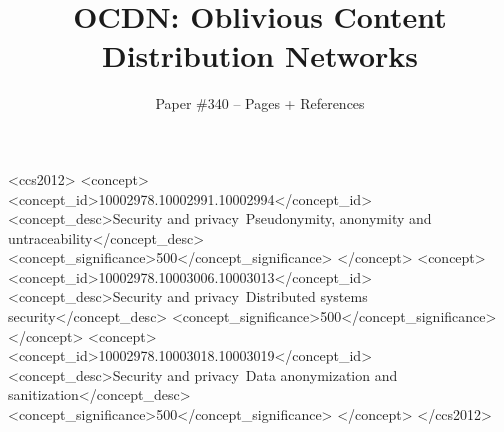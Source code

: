 \documentclass[sigconf]{acmart}
\begin{document}
\date{}
\title{OCDN: Oblivious Content Distribution Networks}
\author{
{Paper \#340 -- \pageref{lastpage} Pages + References} \\
}





\begin{CCSXML}
<ccs2012>
<concept>
<concept_id>10002978.10002991.10002994</concept_id>
<concept_desc>Security and privacy~Pseudonymity, anonymity and untraceability</concept_desc>
<concept_significance>500</concept_significance>
</concept>
<concept>
<concept_id>10002978.10003006.10003013</concept_id>
<concept_desc>Security and privacy~Distributed systems security</concept_desc>
<concept_significance>500</concept_significance>
</concept>
<concept>
<concept_id>10002978.10003018.10003019</concept_id>
<concept_desc>Security and privacy~Data anonymization and sanitization</concept_desc>
<concept_significance>500</concept_significance>
</concept>
</ccs2012>
\end{CCSXML}




\maketitle










\label{lastpage} 


\balance 
\end{document}
